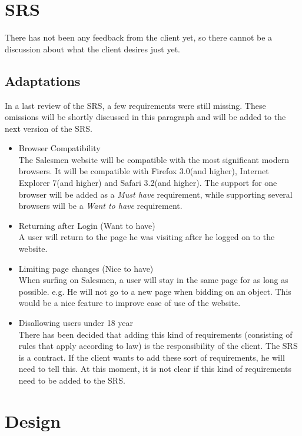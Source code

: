 \documentclass[a4paper, 12pt]{article}
\begin{document}
	\section{SRS}
There has not been any feedback from the client yet, so there cannot be a discussion about what the client desires just yet.
		\subsection{Adaptations}
In a last review of the SRS, a few requirements were still missing. These omissions will be shortly discussed in this paragraph and will be added to the next version of the SRS.
			\begin{itemize}
				\item Browser Compatibility \\
The Salesmen website will be compatible with the most significant modern browsers. It will be compatible with Firefox 3.0(and higher), Internet Explorer 7(and higher) and Safari 3.2(and higher). The support for one browser will be added as a \textit{Must have} requirement, while supporting several browsers will be a \textit{Want to have} requirement.
				\item Returning after Login (Want to have) \\
A user will return to the page he was visiting after he logged on to the website. 
				\item Limiting page changes (Nice to have) \\
When surfing on Salesmen, a user will stay in the same page for as long as possible. e.g. He will not go to a new page when bidding on an object. This would be a nice feature to improve ease of use of the website.
				\item Disallowing users under 18 year \\
There has been decided that adding this kind of requirements (consisting of rules that apply according to law) is the responsibility of the client. The SRS is a contract. If the client wants to add these sort of requirements, he will need to tell this. At this moment, it is not clear if this kind of requirements need to be added to the SRS. 
			\end{itemize}

	\section{Design}
\end{document}

